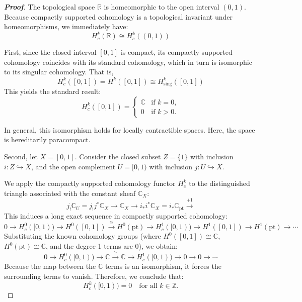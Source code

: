 \begin{proof}[\textbf{Proof}]
    The topological space $\mathbb{R}$ is homeomorphic to the open interval $(0, 1)$. Because compactly supported cohomology is a topological invariant under homeomorphisms, we immediately have:
\begin{equation*}
    H_c^k(\mathbb{R}) \cong H_c^k((0, 1))
\end{equation*}

First, since the closed interval $[0,1]$ is compact, its compactly supported cohomology coincides with its standard cohomology, which in turn is isomorphic to its singular cohomology. That is,
\begin{equation*}
    H_c^k([0,1]) = H^k([0,1]) \cong H_{\text{sing}}^k([0,1])
\end{equation*}
This yields the standard result:
\begin{equation*}
    H_c^k([0,1]) = 
    \begin{cases} 
        \mathbb{C} & \text{if } k = 0, \\ 
        0 & \text{if } k > 0. 
    \end{cases}
\end{equation*}
\begin{remark}
    In general, this isomorphism holds for locally contractible spaces. Here, the space is hereditarily paracompact.
\end{remark}

Second, let $X = [0,1]$. Consider the closed subset $Z = \{1\}$ with inclusion $i \colon Z \hookrightarrow X$, and the open complement $U = [0,1)$ with inclusion $j \colon U \hookrightarrow X$. 

We apply the compactly supported cohomology functor $H_c^k$ to the distinguished triangle associated with the constant sheaf $\mathbb{C}_X$:
\begin{equation*}
    j_! \mathbb{C}_U = j_! j^* \mathbb{C}_X \longrightarrow \mathbb{C}_X \longrightarrow i_* i^* \mathbb{C}_X = i_* \mathbb{C}_{\text{pt}} \xrightarrow{+1}
\end{equation*}
This induces a long exact sequence in compactly supported cohomology:
\begin{equation*}
    0 \longrightarrow H_c^0([0,1)) \longrightarrow H^0([0,1]) \xrightarrow{\cong} H^0(\text{pt}) \longrightarrow H_c^1([0,1)) \longrightarrow H^1([0,1]) \longrightarrow H^1(\text{pt}) \longrightarrow \cdots
\end{equation*}
Substituting the known cohomology groups (where $H^0([0,1]) \cong \mathbb{C}$, $H^0(\text{pt}) \cong \mathbb{C}$, and the degree 1 terms are $0$), we obtain:
\begin{equation*}
    0 \longrightarrow H_c^0([0,1)) \longrightarrow \mathbb{C} \xrightarrow{\cong} \mathbb{C} \longrightarrow H_c^1([0,1)) \longrightarrow 0 \longrightarrow 0 \longrightarrow \cdots
\end{equation*}
Because the map between the $\mathbb{C}$ terms is an isomorphism, it forces the surrounding terms to vanish. Therefore, we conclude that:
\begin{equation*}
    H_c^k([0,1)) = 0 \quad \text{for all } k \in \mathbb{Z}.
\end{equation*}


\end{proof}
